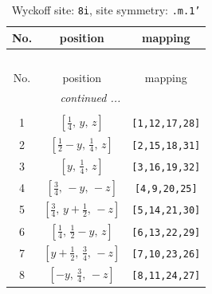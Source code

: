 \documentclass[fleqn,8pt]{jsarticle}
\begin{document}
\begin{longtable}{ccc}
\caption{Wyckoff site: {\tt 8i}, site symmetry: {\tt .m.1'}}
 \\
 \hline \hline
No. & position & mapping \\ \hline \endfirsthead

\multicolumn{2}{l}{\tablename\ \thetable{}} \\
 \hline \hline
No. & position & mapping \\ \hline \endhead

 \hline \hline
\multicolumn{2}{r}{\footnotesize\it continued ...} \\ \endfoot

 \hline \hline
\multicolumn{2}{r}{} \\ \endlastfoot

1 & $\left[ \frac{1}{4},\, y,\, z \right]$ & {\tt [1,12,17,28]} \\ \hline
2 & $\left[ \frac{1}{2} - y,\, \frac{1}{4},\, z \right]$ & {\tt [2,15,18,31]} \\ \hline
3 & $\left[ y,\, \frac{1}{4},\, z \right]$ & {\tt [3,16,19,32]} \\ \hline
4 & $\left[ \frac{3}{4},\, - y,\, - z \right]$ & {\tt [4,9,20,25]} \\ \hline
5 & $\left[ \frac{3}{4},\, y + \frac{1}{2},\, - z \right]$ & {\tt [5,14,21,30]} \\ \hline
6 & $\left[ \frac{1}{4},\, \frac{1}{2} - y,\, z \right]$ & {\tt [6,13,22,29]} \\ \hline
7 & $\left[ y + \frac{1}{2},\, \frac{3}{4},\, - z \right]$ & {\tt [7,10,23,26]} \\ \hline
8 & $\left[ - y,\, \frac{3}{4},\, - z \right]$ & {\tt [8,11,24,27]} \\
\end{longtable}
\renewcommand{\arraystretch}{1.2}
\end{document}
